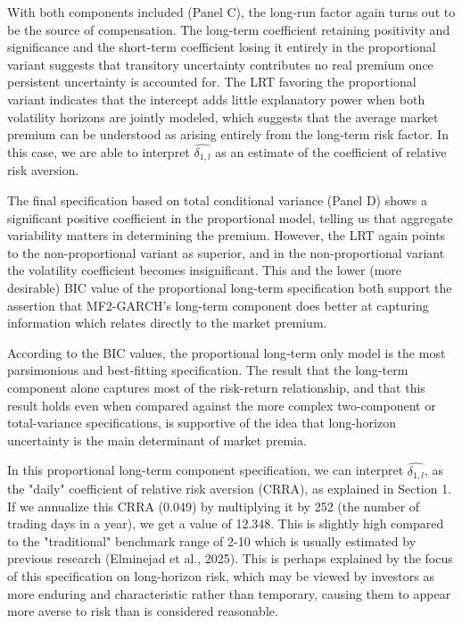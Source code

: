 \documentclass[12pt]{article}
\begin{document}
With both components included (Panel C), the long‑run factor again turns out to be the source of compensation. The long-term coefficient retaining positivity and significance and the short-term coefficient losing it entirely in the proportional variant suggests that transitory uncertainty contributes no real premium once persistent uncertainty is accounted for. The LRT favoring the proportional variant indicates that the intercept adds little explanatory power when both volatility horizons are jointly modeled, which suggests that the average market premium can be understood as arising entirely from the long‑term risk factor. In this case, we are able to interpret $\widehat{\delta_{1,l}}$ as an estimate of the coefficient of relative risk aversion.\par
The final specification based on total conditional variance (Panel D) shows a significant positive coefficient in the proportional model, telling us that aggregate variability matters in determining the premium. However, the LRT again points to the non-proportional variant as superior, and in the non‑proportional variant the volatility coefficient becomes insignificant. This and the lower (more desirable) BIC value of the proportional long-term specification both support the assertion that MF2-GARCH's long-term component does better at capturing information which relates directly to the market premium.\par
According to the BIC values, the proportional long‑term only model is the most parsimonious and best‐fitting specification. The result that the long‑term component alone captures most of the risk-return relationship, and that this result holds even when compared against the more complex two-component or total-variance specifications, is supportive of the idea that long-horizon uncertainty is the main determinant of market premia. \par
In this proportional long-term component specification, we can interpret $\widehat{\delta_{1,l}}$, as the "daily" coefficient of relative risk aversion (CRRA), as explained in Section 1. If we annualize this CRRA (0.049) by multiplying it by 252 (the number of trading days in a year), we get a value of 12.348. This is slightly high compared to the "traditional" benchmark range of 2-10 which is usually estimated by previous research (Elminejad et al., 2025). This is perhaps explained by the focus of this specification on long-horizon risk, which may be viewed by investors as more enduring and characteristic rather than temporary, causing them to appear more averse to risk than is considered reasonable.\par
\end{document}
